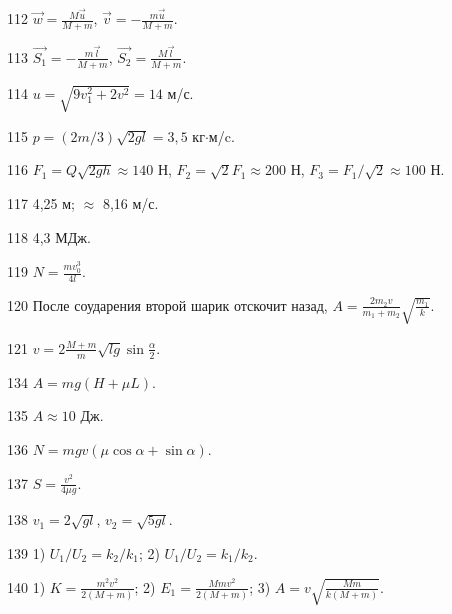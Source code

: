 \begin{Answer}{112}
$\vec{w} = \frac{M\vec{u}}{M+m}$, $\vec{v} = -\frac{m\vec{u}}{M+m}$.
\end{Answer}
\begin{Answer}{113}
$\vec{S_1} = -\frac{m\vec{l}}{M+m}$, $\vec{S_2} = \frac{M\vec{l}}{M+m}$.
\end{Answer}
\begin{Answer}{114}
$u = \sqrt{9v_{1}^2 + 2v^2} = 14$ м/с.
\end{Answer}
\begin{Answer}{115}
$p = (2m/3)\sqrt{2gl} = 3,5$ кг$\cdot$м/c.
\end{Answer}
\begin{Answer}{116}
$F_1 = Q\sqrt{2gh} \approx 140$ Н, $F_2 = \sqrt{2} F_1 \approx 200$ Н, $F_3 = F_1/\sqrt{2} \approx 100$ Н.
\end{Answer}
\begin{Answer}{117}
4,25 м; $\approx$ 8,16 м/с.
\end{Answer}
\begin{Answer}{118}
4,3 МДж.
\end{Answer}
\begin{Answer}{119}
$N =\frac{mv_{0}^3}{4l}$.
\end{Answer}
\begin{Answer}{120}
После соударения второй шарик отскочит назад, $A = \frac{2m_2v}{m_1+m_2}\sqrt{\frac{m_1}{k}}$.
\end{Answer}
\begin{Answer}{121}
$v = 2\frac{M+m}{m}\sqrt{lg}\sin \frac{\alpha}{2}$.
\end{Answer}
\begin{Answer}{134}
$A=mg(H+\mu L)$.
\end{Answer}
\begin{Answer}{135}
$A \approx 10$ Дж.
\end{Answer}
\begin{Answer}{136}
$N = mgv(\mu \cos \alpha +\sin \alpha)$.
\end{Answer}
\begin{Answer}{137}
$S = \frac{v^2}{4 \mu g}$.
\end{Answer}
\begin{Answer}{138}
$v_1 = 2\sqrt{gl}$, $v_2 = \sqrt{5gl}$.
\end{Answer}
\begin{Answer}{139}
1) $U_1/U_2 = k_2/k_1$; 2) $U_1/U_2 = k_1/k_2$.
\end{Answer}
\begin{Answer}{140}
1) $K=\frac{m^2v^2}{2(M+m)}$; 2) $E_1 = \frac{Mmv^2}{2(M+m)}$; 3) $A = v\sqrt{\frac{Mm}{k(M+m)}}$.
\end{Answer}

